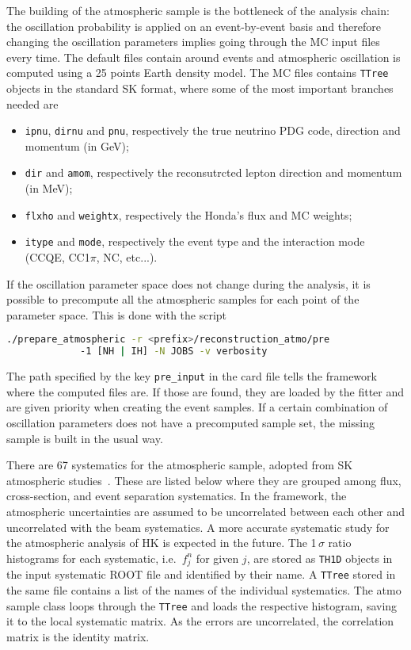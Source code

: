 \documentclass[a4paper, 11pt]{article}
\begin{document}
The building of the atmospheric sample is the bottleneck of the analysis chain: %
the oscillation probability is applied on an event-by-event basis and therefore changing %
the oscillation parameters implies going through the MC input files every time.
The default files contain around  events and atmospheric oscillation is computed using %
a 25 points Earth density model.
The MC files contains \texttt{TTree} objects in the standard SK format, where some of the most important branches needed are
\begin{itemize}
	\item \texttt{ipnu}, \texttt{dirnu} and \texttt{pnu}, respectively the true neutrino PDG code, direction and momentum (in GeV);
	\item \texttt{dir} and \texttt{amom}, respectively the reconsutrcted lepton direction and momentum (in MeV);
	\item \texttt{flxho} and \texttt{weightx}, respectively the Honda's flux and MC weights;
	\item \texttt{itype} and \texttt{mode}, respectively the event type and the interaction mode (CCQE, CC1$\pi$, NC, etc...).
\end{itemize}

If the oscillation parameter space does not change during the analysis, it is possible to precompute %
all the atmospheric samples for each point of the parameter space.
This is done with the script
\begin{lstlisting}[language=bash]
   ./prepare_atmospheric -r <prefix>/reconstruction_atmo/pre
   			 -1 [NH | IH] -N JOBS -v verbosity
\end{lstlisting}
The path specified by the key \texttt{pre\_input} in the card file tells the framework where %
the computed files are.
If those are found, they are loaded by the fitter and are given priority when %
creating the event samples.
If a certain combination of oscillation parameters does not have a precomputed sample set, %
the missing sample is built in the usual way.


There are 67 systematics for the atmospheric sample, adopted from SK atmospheric studies~\cite{Abe:2017aap}.
These are listed below where they are grouped among flux, cross-section, and %
event separation systematics.
In the framework, the atmospheric uncertainties are assumed to be uncorrelated between each other and uncorrelated with the beam systematics.
A more accurate systematic study for the atmospheric analysis of HK is expected in the future.
The 1\,$\sigma$ ratio histograms for each systematic, i.e.\ $f^n_j$ for given $j$, are stored as \texttt{TH1D} %
objects in the input systematic ROOT file and identified by their name.
A \texttt{TTree} stored in the same file contains a list of the names of the individual systematics.
The atmo sample class loops through the \texttt{TTree} and loads the respective histogram, saving it to the %
local systematic matrix.
As the errors are uncorrelated, the correlation matrix is the identity matrix.
\end{document}
